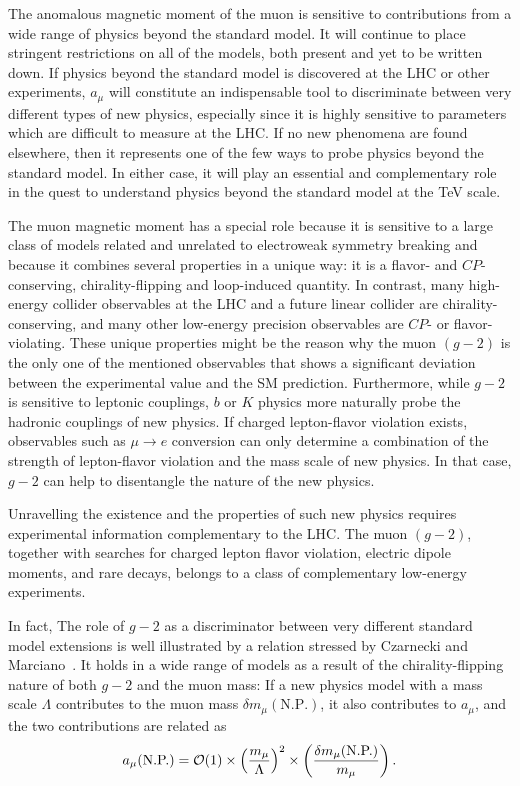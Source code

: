 The anomalous magnetic moment of the muon is sensitive to
contributions from a wide range of physics beyond the standard
model. It  will continue to place stringent restrictions on all of
the models, both present and yet to be written down. If  
physics beyond the standard model is discovered at the LHC 
or other experiments,
$a_\mu$  will constitute an indispensable tool to discriminate
between very different types of new physics, especially since it is
highly sensitive to parameters which are difficult to measure at the
LHC. If no new phenomena are found elsewhere, then it represents one of the few ways
to probe physics beyond the standard model. In either case, it will play an
essential and complementary role in the quest to understand physics
beyond the standard model at the TeV scale. 

The muon magnetic moment has a special role because it is
sensitive to a large class of models related and unrelated to electroweak symmetry breaking and
because it combines several properties in a unique way: it is a
flavor- and $C\!P$-conserving, chirality-flipping and loop-induced 
quantity. In contrast, many high-energy collider observables at the
LHC and a future linear collider are chirality-conserving, and many
other low-energy precision observables are $C\!P$- or
flavor-violating. These unique properties might be the reason why the
muon $(g-2)$ is the only one of the mentioned observables that shows a 
significant deviation between the experimental value and the SM
prediction.  Furthermore, while $g-2$ is sensitive
to leptonic couplings, 
$b$ or $K$ physics more naturally probe the hadronic couplings of new
physics. If charged lepton-flavor violation exists, observables such
as $\mu\to e$ conversion can only determine a combination of the
strength of lepton-flavor violation and the mass scale of new
physics. In that case, $g-2$ can help to disentangle the nature of the
new physics. 



Unravelling the existence and the properties of such new physics
requires experimental information complementary to the LHC.
The muon $(g-2)$, together
with searches for charged lepton flavor violation, electric dipole
moments, and rare decays, belongs to a class of complementary
low-energy experiments.

In fact, 
The role of $g-2$ as a discriminator between very different standard
model extensions is well illustrated by a relation stressed by
Czarnecki and Marciano~\cite{czmar}. It holds in a wide range of
models as a result of the chirality-flipping nature of both  $g-2$ and
the muon mass: If a new
physics model with a mass scale $\Lambda$
contributes to the muon mass $\delta m_\mu(\mbox{N.P.})$, it also
contributes to $a_\mu$, and the two contributions are related as
\begin{equation}
\label{CzMbound} a_\mu(\mbox{N.P.})={\cal O}(1)\times
\left(\frac{m_\mu}{\Lambda}\right)^2 \times \left(\frac{\delta
m_\mu(\mbox{N.P.})}{m_\mu}\right). 
\end{equation}

